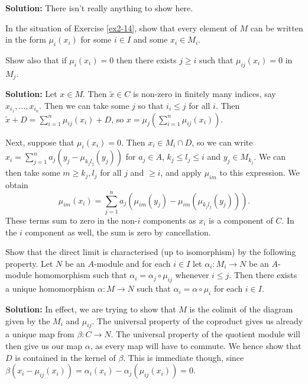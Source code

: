 \documentclass{article}
\begin{document}
\noindent\textbf{Solution:}
There isn't really anything to show here.

\begin{exercise} \label{ex2-15}
    In the situation of Exercise \ref{ex2-14}, show that every element of \(M\) can be written in the form \(\mu_i(x_i)\) for some \(i \in I\) and some \(x_i \in M_i\).

    Show also that if \(\mu_i(x_i) = 0\) then there exists \(j \geq i\) such that \(\mu_{ij}(x_i) = 0\) in \(M_j\).
\end{exercise}

\noindent\textbf{Solution:}
Let \(x \in M\).
Then \(\tilde{x} \in C\) is non-zero in finitely many indices, say \(x_{i_1}, \dots, x_{i_n}\).
Then we can take some \(j\) so that \(i_i \leq j\) for all \(i\).
Then \(\tilde{x} + D = \sum_{i=1}^n \mu_{ij}(x_i) + D\), so \(x = \mu_j(\sum_{i=1}^n \mu_{ij}(x_i))\).

Next, suppose that \(\mu_i(x_i) = 0\).
Then \(x_i \in M_i \cap D\), so we can write \(x_i = \sum_{j=1}^n a_j (y_j - \mu_{k_j l_j}(y_j))\) for \(a_j \in A\), \(k_j \leq l_j \leq i\) and \(y_j \in M_{k_j}\).
We can then take some \(m \geq k_j, l_j\) for all \(j\) and \(\geq i\), and apply \(\mu_{im}\) to this expression.
We obtain
\[
    \mu_{im}(x_i)
    = \sum_{j=1}^n a_j (\mu_{im}(y_j) - \mu_{im}(\mu_{k_j l_j}(y_j))).
\]
These terms sum to zero in the non-\(i\) components as \(x_i\) is a component of \(C\).
In the \(i\) component as well, the sum is zero by cancellation.

\begin{exercise} \label{ex2-16}
    Show that the direct limit is characterised (up to isomorphism) by the following property.
    Let \(N\) be an \(A\)-module and for each \(i \in I\) let \(\alpha_i : M_i \to N\) be an \(A\)-module homomorphism such that \(\alpha_i = \alpha_j \circ \mu_{ij}\) whenever \(i \leq j\).
    Then there exists a unique homomorphism \(\alpha : M \to N\) such that \(\alpha_i = \alpha \circ \mu_i\) for each \(i \in I\).
\end{exercise}

\noindent\textbf{Solution:}
In effect, we are trying to show that \(M\) is the colimit of the diagram given by the \(M_i\) and \(\mu_{ij}\).
The universal property of the coproduct gives us already a unique map from \(\beta : C \to N\).
The universal property of the quotient module will then give us our map \(\alpha\), as every map will have to commute.
We hence show that \(D\) is contained in the kernel of \(\beta\).
This is immediate though, since \(\beta(x_i - \mu_{ij}(x_i)) = \alpha_i(x_i) - \alpha_j(\mu_{ij}(x_i)) = 0\).
\end{document}
